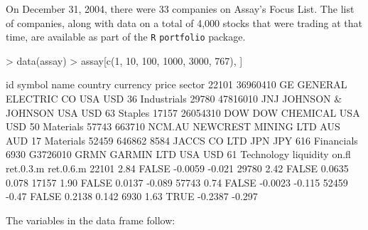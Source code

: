 \documentclass{article}
\begin{document}
On December 31, 2004, there were 33 companies on Assay's Focus List.
The list of companies, along with data on a total of 4,000 stocks that
were trading at that time, are available as part of the \texttt{R}
\texttt{portfolio} package.



\begin{Schunk}
\begin{Sinput}
> data(assay)
> assay[c(1, 10, 100, 1000, 3000, 767), ]
\end{Sinput}
\begin{Soutput}
            id symbol                name country currency price      sector
22101 36960410     GE GENERAL ELECTRIC CO     USA      USD    36 Industrials
29780 47816010    JNJ   JOHNSON & JOHNSON     USA      USD    63     Staples
17157 26054310    DOW        DOW CHEMICAL     USA      USD    50   Materials
57743   663710 NCM.AU NEWCREST MINING LTD     AUS      AUD    17   Materials
52459   646862   8584        JACCS CO LTD     JPN      JPY   616  Financials
6930  G3726010   GRMN          GARMIN LTD     USA      USD    61  Technology
      liquidity on.fl ret.0.3.m ret.0.6.m
22101      2.84 FALSE   -0.0059    -0.021
29780      2.42 FALSE    0.0635     0.078
17157      1.90 FALSE    0.0137    -0.089
57743      0.74 FALSE   -0.0023    -0.115
52459     -0.47 FALSE    0.2138     0.142
6930       1.63  TRUE   -0.2387    -0.297
\end{Soutput}
\end{Schunk}

The variables in the data frame follow:
\end{document}
